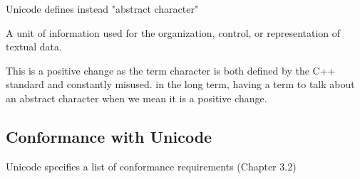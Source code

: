 \documentclass{wg21}
\begin{document}
Unicode defines instead "abstract character"
\begin{quoteblock}
A unit of information used for the organization, control, or representation of textual data.
\end{quoteblock}

This is a positive change as the term character is both defined by the C++ standard and constantly misused.
in the long term, having a term to talk about an abstract character when we mean it is a positive change.

\subsection{Conformance with Unicode}

Unicode specifies a list of conformance requirements (Chapter 3.2)
\end{document}
